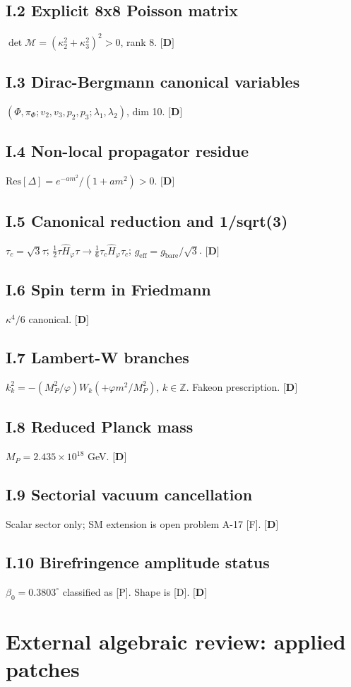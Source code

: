 ﻿\documentclass[11pt,letterpaper]{article}
\begin{document}
\subsection{I.2 Explicit 8x8 Poisson matrix}
$\det\mathcal{M} = (\kappa_2^2 + \kappa_3^2)^2 > 0$, rank 8. $\textbf{[D]}$
\subsection{I.3 Dirac-Bergmann canonical variables}
$(\Phi, \pi_\Phi; v_2, v_3, p_2, p_3; \lambda_1, \lambda_2)$, dim 10. $\textbf{[D]}$
\subsection{I.4 Non-local propagator residue}
$\mathrm{Res}[\Delta] = e^{-am^2}/(1+am^2) > 0$. $\textbf{[D]}$
\subsection{I.5 Canonical reduction and 1/sqrt(3)}
$\tau_c = \sqrt{3}\tau$; $\tfrac{1}{2}\tau\hat{H}_\varphi\tau \to \tfrac{1}{6}\tau_c\hat{H}_\varphi\tau_c$; $g_{\mathrm{eff}} = g_{\mathrm{bare}}/\sqrt{3}$. $\textbf{[D]}$
\subsection{I.6 Spin term in Friedmann}
$\kappa^4/6$ canonical. $\textbf{[D]}$
\subsection{I.7 Lambert-W branches}
$k_k^2 = -(M_P^2/\varphi)W_k(+\varphi m^2/M_P^2)$, $k \in \mathbb{Z}$. Fakeon prescription. $\textbf{[D]}$
\subsection{I.8 Reduced Planck mass}
$M_P = 2{.}435 \times 10^{18}$ GeV. $\textbf{[D]}$
\subsection{I.9 Sectorial vacuum cancellation}
Scalar sector only; SM extension is open problem A-17 [F]. $\textbf{[D]}$
\subsection{I.10 Birefringence amplitude status}
$\beta_0 = 0{.}3803^\circ$ classified as [P]. Shape is [D]. $\textbf{[D]}$
\section{External algebraic review: applied patches}
\end{document}
